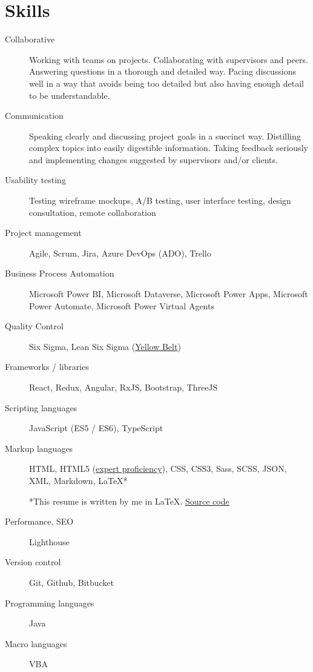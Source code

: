 \documentclass{article}
\begin{document}
\vspace{-1em}
\section*{Skills}\vspace{-0.5em}

\begin{description}
  \item [Collaborative] Working with teams on projects. Collaborating with supervisors and peers. Answering questions in a thorough and detailed way. Pacing discussions well in a way that avoids being too detailed but also having enough detail to be understandable.
  \item [Communication] Speaking clearly and discussing project goals in a succinct way. Distilling complex topics into easily digestible information. Taking feedback seriously and implementing changes suggested by supervisors and/or clients.
  \item [Usability testing] Testing wireframe mockups, A/B testing, user interface testing, design consultation, remote collaboration
  \item [Project management] Agile, Scrum, Jira, Azure DevOps (ADO), Trello
  \item [Business Process Automation] Microsoft Power BI, Microsoft Dataverse, Microsoft Power Apps, Microsoft Power Automate, Microsoft Power Virtual Agents
  \item [Quality Control] Six Sigma, Lean Six Sigma (\href{https://api.badgr.io/public/assertions/KE5P9gfoQ7S3-hpvZP4PIQ}{Yellow Belt})
  \item [Frameworks / libraries] React, Redux, Angular, RxJS, Bootstrap, ThreeJS
  \item [Scripting languages] JavaScript (ES5 / ES6), TypeScript
  \item [Markup languages] HTML, HTML5 (\href{https://app.pluralsight.com/profile/alexander-koik-cesto}{expert proficiency}), CSS, CSS3, Sass, SCSS, JSON, XML, Markdown, LaTeX*
  \item []*This resume is written by me in LaTeX. \href{https://github.com/sirkoik/CurriculumVitae/blob/master/source/main/resume.tex}{Source code}
  \item [Performance, SEO] Lighthouse
  \item [Version control] Git, Github, Bitbucket
  \item [Programming languages] Java
  \item [Macro languages] VBA

\end{description}
\end{document}
